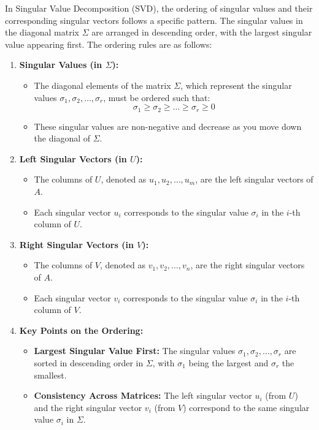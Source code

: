 \begin{warning}
    In Singular Value Decomposition (SVD), the ordering of singular values and their corresponding singular vectors follows a specific pattern. The singular values in the diagonal matrix \( \Sigma \) are arranged in descending order, with the largest singular value appearing first. The ordering rules are as follows:

    \begin{enumerate}
        \item \textbf{Singular Values (in \( \Sigma \)):}
        \begin{itemize}
            \item The diagonal elements of the matrix \( \Sigma \), which represent the singular values \( \sigma_1, \sigma_2, \dots, \sigma_r \), must be ordered such that:
            \[
            \sigma_1 \geq \sigma_2 \geq \dots \geq \sigma_r \geq 0
            \]
            \item These singular values are non-negative and decrease as you move down the diagonal of \( \Sigma \).
        \end{itemize}

        \item \textbf{Left Singular Vectors (in \( U \)):}
        \begin{itemize}
            \item The columns of \( U \), denoted as \( u_1, u_2, \dots, u_m \), are the left singular vectors of \( A \).
            \item Each singular vector \( u_i \) corresponds to the singular value \( \sigma_i \) in the \( i \)-th column of \( U \).
        \end{itemize}

        \item \textbf{Right Singular Vectors (in \( V \)):}
        \begin{itemize}
            \item The columns of \( V \), denoted as \( v_1, v_2, \dots, v_n \), are the right singular vectors of \( A \).
            \item Each singular vector \( v_i \) corresponds to the singular value \( \sigma_i \) in the \( i \)-th column of \( V \).
        \end{itemize}

        \item \textbf{Key Points on the Ordering:}
        \begin{itemize}
            \item \textbf{Largest Singular Value First:} The singular values \( \sigma_1, \sigma_2, \dots, \sigma_r \) are sorted in descending order in \( \Sigma \), with \( \sigma_1 \) being the largest and \( \sigma_r \) the smallest.
            \item \textbf{Consistency Across Matrices:} The left singular vector \( u_i \) (from \( U \)) and the right singular vector \( v_i \) (from \( V \)) correspond to the same singular value \( \sigma_i \) in \( \Sigma \).
        \end{itemize}
    \end{enumerate}
\end{warning}